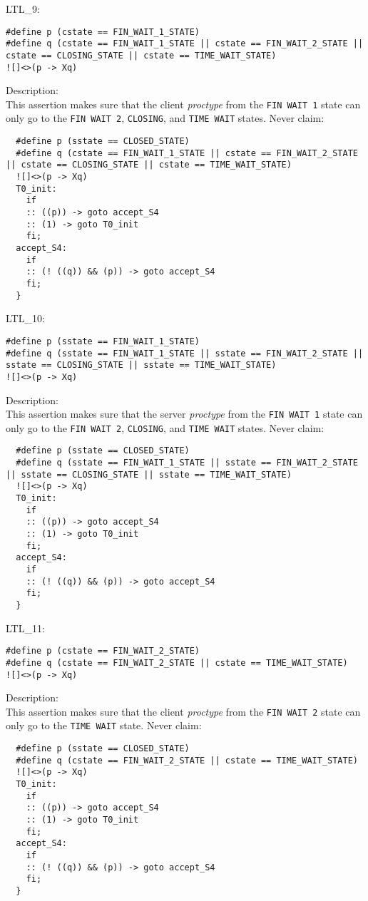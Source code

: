 \documentclass{WigReport}
\begin{document}
LTL\_9:\\
\begin{lstlisting}
#define p (cstate == FIN_WAIT_1_STATE)
#define q (cstate == FIN_WAIT_1_STATE || cstate == FIN_WAIT_2_STATE || cstate == CLOSING_STATE || cstate == TIME_WAIT_STATE)
![]<>(p -> Xq)
\end{lstlisting}
Description:\\
This assertion makes sure that the client \textit{proctype} from the \verb|FIN WAIT 1| state can only go to the \verb|FIN WAIT 2|, \verb|CLOSING|, and \verb|TIME WAIT| states.
Never claim:\\
\begin{lstlisting}
  #define p (sstate == CLOSED_STATE)
  #define q (cstate == FIN_WAIT_1_STATE || cstate == FIN_WAIT_2_STATE || cstate == CLOSING_STATE || cstate == TIME_WAIT_STATE)
  ![]<>(p -> Xq)
  T0_init:
    if
    :: ((p)) -> goto accept_S4
    :: (1) -> goto T0_init
    fi;
  accept_S4:
    if
    :: (! ((q)) && (p)) -> goto accept_S4
    fi;
  }
\end{lstlisting}


LTL\_10:\\
\begin{lstlisting}
#define p (sstate == FIN_WAIT_1_STATE)
#define q (sstate == FIN_WAIT_1_STATE || sstate == FIN_WAIT_2_STATE || sstate == CLOSING_STATE || sstate == TIME_WAIT_STATE)
![]<>(p -> Xq)
\end{lstlisting}
Description:\\
This assertion makes sure that the server \textit{proctype} from the \verb|FIN WAIT 1| state can only go to the \verb|FIN WAIT 2|, \verb|CLOSING|, and \verb|TIME WAIT| states.
Never claim:\\
\begin{lstlisting}
  #define p (sstate == CLOSED_STATE)
  #define q (sstate == FIN_WAIT_1_STATE || sstate == FIN_WAIT_2_STATE || sstate == CLOSING_STATE || sstate == TIME_WAIT_STATE)
  ![]<>(p -> Xq)
  T0_init:
    if
    :: ((p)) -> goto accept_S4
    :: (1) -> goto T0_init
    fi;
  accept_S4:
    if
    :: (! ((q)) && (p)) -> goto accept_S4
    fi;
  }
\end{lstlisting}


LTL\_11:\\
\begin{lstlisting}
#define p (cstate == FIN_WAIT_2_STATE)
#define q (cstate == FIN_WAIT_2_STATE || cstate == TIME_WAIT_STATE)
![]<>(p -> Xq)
\end{lstlisting}
Description:\\
This assertion makes sure that the client \textit{proctype} from the \verb|FIN WAIT 2| state can only go to the \verb|TIME WAIT| state.
Never claim:\\
\begin{lstlisting}
  #define p (sstate == CLOSED_STATE)
  #define q (cstate == FIN_WAIT_2_STATE || cstate == TIME_WAIT_STATE)
  ![]<>(p -> Xq)
  T0_init:
    if
    :: ((p)) -> goto accept_S4
    :: (1) -> goto T0_init
    fi;
  accept_S4:
    if
    :: (! ((q)) && (p)) -> goto accept_S4
    fi;
  }
\end{lstlisting}
\end{document}
